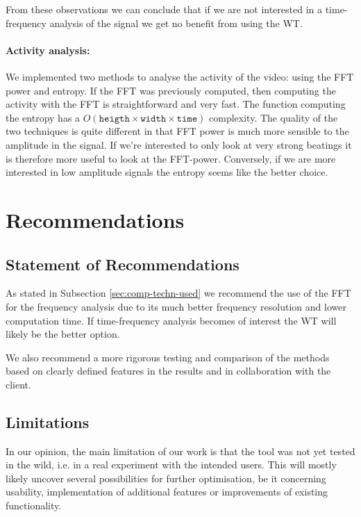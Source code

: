 \documentclass[11pt]{scrartcl}
\begin{document}
From these observations we can conclude that if we are not interested in a time-frequency analysis of the signal we get no benefit from using the WT.

\paragraph{Activity analysis:}

We implemented two methods to analyse the activity of the video: using the FFT power and entropy. 
If the FFT was previously computed, then computing the activity with the FFT is
straightforward and very fast. The function computing the entropy has a $O(\mathtt{heigth} \times \mathtt{width}
\times \mathtt{time})$ complexity. The quality of the two techniques is quite different in that FFT power is much more sensible to the amplitude in the signal. 
If we're interested to only look at very strong beatings it is therefore more useful to look at the FFT-power. Conversely, if we are more interested in low amplitude signals the entropy seems like the better choice. 



\section{Recommendations}

\subsection{Statement of Recommendations}
As stated in Subsection \ref{sec:comp-techn-used} we recommend the use of the FFT for the frequency analysis due to its much better frequency resolution and lower computation time. If time-frequency analysis becomes of interest the WT will likely be the better option.   

We also recommend a more rigorous testing and comparison of the methods based on clearly defined features in the results and in collaboration with the client.

\subsection{Limitations}
In our opinion, the main limitation of our work is that the tool was not yet tested in the wild, i.e. in a real experiment with the intended users. This will mostly likely uncover several possibilities for further optimisation, be it concerning usability, implementation of additional features or improvements of existing functionality. 
\end{document}
